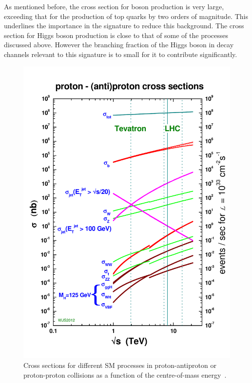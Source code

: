 As mentioned before, the cross section for \Z boson production is very large, exceeding that for the production of top quarks by two orders of magnitude. This underlines the importance \MET in the signature to reduce this background.
The cross section for Higgs boson production is close to that of some of the processes discussed above. However the branching fraction of the Higgs boson in decay channels relevant to this signature is to small for it to contribute significantly. 
\begin{figure}
\centering
\includegraphics[scale=0.3]{plots/THEO/crosssections2012_v5.pdf}
\caption{Cross sections for different SM processes in proton-antiproton or proton-proton collisions as a function of the centre-of-mass energy~\cite{sterling}.}
\label{fig:xsecs}
\end{figure}  